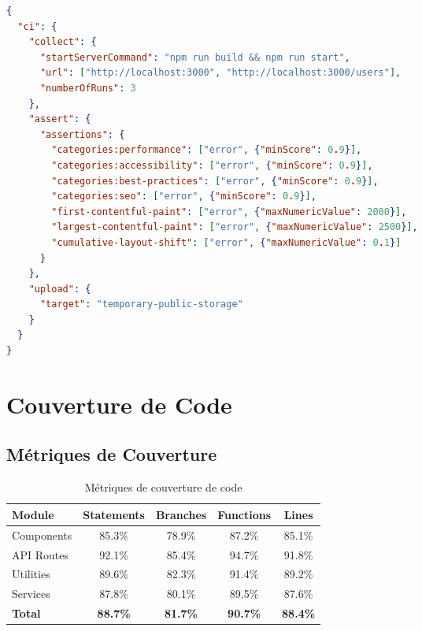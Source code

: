 \begin{lstlisting}[language=JSON, caption=Configuration Lighthouse CI]
{
  "ci": {
    "collect": {
      "startServerCommand": "npm run build && npm run start",
      "url": ["http://localhost:3000", "http://localhost:3000/users"],
      "numberOfRuns": 3
    },
    "assert": {
      "assertions": {
        "categories:performance": ["error", {"minScore": 0.9}],
        "categories:accessibility": ["error", {"minScore": 0.9}],
        "categories:best-practices": ["error", {"minScore": 0.9}],
        "categories:seo": ["error", {"minScore": 0.9}],
        "first-contentful-paint": ["error", {"maxNumericValue": 2000}],
        "largest-contentful-paint": ["error", {"maxNumericValue": 2500}],
        "cumulative-layout-shift": ["error", {"maxNumericValue": 0.1}]
      }
    },
    "upload": {
      "target": "temporary-public-storage"
    }
  }
}
\end{lstlisting}

\section{Couverture de Code}

\subsection{Métriques de Couverture}

\begin{table}[H]
    \centering
    \begin{tabularx}{\textwidth}{|l|c|c|c|c|}
        \hline
        \textbf{Module} & \textbf{Statements} & \textbf{Branches} & \textbf{Functions} & \textbf{Lines} \\
        \hline
        Components & 85.3\% & 78.9\% & 87.2\% & 85.1\% \\
        \hline
        API Routes & 92.1\% & 85.4\% & 94.7\% & 91.8\% \\
        \hline
        Utilities & 89.6\% & 82.3\% & 91.4\% & 89.2\% \\
        \hline
        Services & 87.8\% & 80.1\% & 89.5\% & 87.6\% \\
        \hline
        \textbf{Total} & \textbf{88.7\%} & \textbf{81.7\%} & \textbf{90.7\%} & \textbf{88.4\%} \\
        \hline
    \end{tabularx}
    \caption{Métriques de couverture de code}
    \label{tab:code_coverage}
\end{table}

